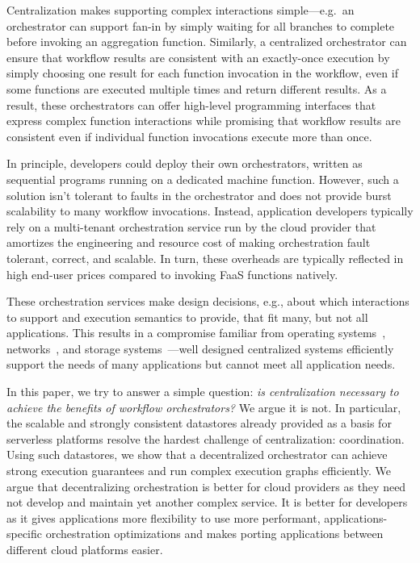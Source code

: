 Centralization makes supporting complex interactions simple---e.g.\ an
orchestrator can support fan-in by simply waiting for all branches to complete
before invoking an aggregation function. Similarly, a centralized orchestrator
can ensure that workflow results are consistent with an exactly-once execution
by simply choosing one result for each function invocation in the workflow, even
if some functions are executed multiple times and return different results. As a
result, these orchestrators can offer high-level programming interfaces that
express complex function interactions while promising that workflow results are
consistent even if individual function invocations execute more than once.

In principle, developers could deploy their own orchestrators, written as
sequential programs running on a dedicated machine function. However, such a
solution isn't tolerant to faults in the orchestrator and does not provide burst
scalability to many workflow invocations. Instead, application developers
typically rely on a multi-tenant orchestration service run by the cloud provider
that amortizes the engineering and resource cost of making orchestration fault
tolerant, correct, and scalable. In turn, these overheads are typically
reflected in high end-user prices compared to invoking FaaS functions natively.

These orchestration services make design decisions, e.g., about which
interactions to support and execution semantics to provide, that fit many, but
not all applications. This results in a compromise familiar from operating
systems~\cite{exokernel,spin}, networks~\cite{active-networks,sdn}, and storage
systems~\cite{comet,splinter}---well designed centralized systems efficiently
support the needs of many applications but cannot meet all application needs.
%

In this paper, we try to answer a simple question: \textit{is centralization
\emph{necessary} to achieve the benefits of workflow  orchestrators?} We argue
it is not. In particular, the scalable and strongly consistent datastores
already provided as a basis for serverless platforms resolve the hardest
challenge of centralization: coordination. Using such datastores, we show that a
decentralized orchestrator can achieve strong execution guarantees and run
complex execution graphs efficiently. We argue that decentralizing orchestration
is better for cloud providers as they need not develop and maintain yet another
complex service. It is better for developers as it gives applications more
flexibility to use more performant, applications-specific orchestration
optimizations and makes porting applications between different cloud platforms
easier.

